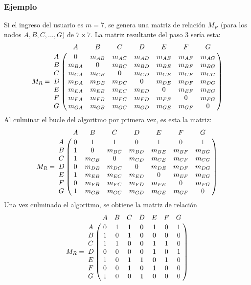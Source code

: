 \documentclass[12pt]{article}
\begin{document}
\subsubsection*{Ejemplo}
Si el ingreso del usuario es $m=7$, se genera una matriz de relaci\'{o}n $M_{R}$ (para los nodos $A, B, C, ..., G$) de $7\times 7$. La matriz resultante del paso 3 ser\'{i}a esta:
$$M_{R}=
\bordermatrix{
     &     A     &     B          &     C          &     D          &     E          &     F          &     G          \cr
A    &     0     &     m_{AB}     &     m_{AC}     &     m_{AD}     &     m_{AE}     &     m_{AF}     &     m_{AG}     \cr
B    &     m_{BA}&     0          &     m_{BC}     &     m_{BD}     &     m_{BE}     &     m_{BF}     &     m_{BG}     \cr
C    &     m_{CA}&     m_{CB}     &     0          &     m_{CD}     &     m_{CE}     &     m_{CF}     &     m_{CG}     \cr
D    &     m_{DA}&     m_{DB}     &     m_{DC}     &     0          &     m_{DE}     &     m_{DF}     &     m_{DG}     \cr
E    &     m_{EA}&     m_{EB}     &     m_{EC}     &     m_{ED}     &     0          &     m_{EF}     &     m_{EG}     \cr
F    &     m_{FA}&     m_{FB}     &     m_{FC}     &     m_{FD}     &     m_{FE}     &     0          &     m_{FG}     \cr
G    &     m_{GA}&     m_{GB}     &     m_{GC}     &     m_{GD}     &     m_{GE}     &     m_{GF}     &     0     \cr
}
$$
Al culminar el bucle del algoritmo por primera vez, es esta la matriz:
$$M_{R}=
\bordermatrix{
     &     A     &     B          &     C          &     D          &     E          &     F          &     G          \cr
A    &     0     &     1          &     1          &     0          &     1          &     0          &     1          \cr
B    &     1     &     0          &     m_{BC}     &     m_{BD}     &     m_{BE}     &     m_{BF}     &     m_{BG}     \cr
C    &     1     &     m_{CB}     &     0          &     m_{CD}     &     m_{CE}     &     m_{CF}     &     m_{CG}     \cr
D    &     0     &     m_{DB}     &     m_{DC}     &     0          &     m_{DE}     &     m_{DF}     &     m_{DG}     \cr
E    &     1     &     m_{EB}     &     m_{EC}     &     m_{ED}     &     0          &     m_{EF}     &     m_{EG}     \cr
F    &     0     &     m_{FB}     &     m_{FC}     &     m_{FD}     &     m_{FE}     &     0          &     m_{FG}     \cr
G    &     1     &     m_{GB}     &     m_{GC}     &     m_{GD}     &     m_{GE}     &     m_{GF}     &     0     \cr
}
$$
Una vez culminado el algoritmo, se obtiene la matriz de relaci\'{o}n
$$M_{R}=
\bordermatrix{
 &A&B&C&D&E&F&G\cr
A&0&1&1&0&1&0&1\cr
B&1&0&1&0&0&0&0\cr
C&1&1&0&0&1&1&0\cr
D&0&0&0&0&1&0&1\cr
E&1&0&1&1&0&1&0\cr
F&0&0&1&0&1&0&0\cr
G&1&0&0&1&0&0&0\cr
}
$$
\end{document}
